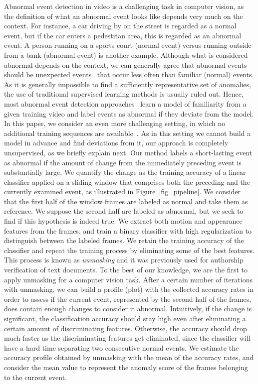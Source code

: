 \documentclass[10pt,twocolumn,letterpaper]{article}
\begin{document}
Abnormal event detection in video is a challenging task in computer vision, as the definition of what an abnormal event looks like depends very much on the context. For instance, a car driving by on the street is regarded as a normal event, but if the car enters a pedestrian area, this is regarded as an abnormal event. A person running on a sports court (normal event) versus running outside from a bank (abnormal event) is another example. Although what is considered abnormal depends on the context, we can generally agree that abnormal events should be unexpected events~\cite{Itti-CVPR-2005} that occur less often than familiar (normal) events. As it is generally impossible to find a sufficiently representative set of anomalies, the use of traditional supervised learning methods is usually ruled out. Hence, most abnormal event detection approaches~\cite{Antic-ICCV-2011,Cheng-CVPR-2015,Kim-CVPR-2009,Li-PAMI-2014,Lu-ICCV-2013,Mahadevan-CVPR-2010,Mehran-CVPR-2009,Xu-BMVC-2015,Zhao-CVPR-2011} learn a model of familiarity from a given training video and label events as abnormal if they deviate from the model. In this paper, we consider an even more challenging setting, in which no additional training sequences are available~\cite{Giorno-ECCV-2016}. As in this setting we cannot build a model in advance and find deviations from it, our approach is completely unsupervised, as we briefly explain next. Our method labels a short-lasting event as abnormal if the amount of change from the immediately preceding event is substantially large. We quantify the change as the training accuracy of a linear classifier applied on a sliding window that comprises both the preceding and the currently examined event, as illustrated in Figure~\ref{fig_pipeline}. We consider that the first half of the window frames are labeled as normal and take them as reference. We suppose the second half are labeled as abnormal, but we seek to find if this hypothesis is indeed true. We extract both motion and appearance features from the frames, and train a binary classifier with high regularization to distinguish between the labeled frames. We retain the training accuracy of the classifier and repeat the training process by eliminating some of the best features. This process is known as \emph{unmasking} \cite{Koppel-JMLR-2007} and it was previously used for authorship verification of text documents. To the best of our knowledge, we are the first to apply unmasking for a computer vision task. After a certain number of iterations with unmasking, we can build a profile (plot) with the collected accuracy rates in order to assess if the current event, represented by the second half of the frames, does contain enough changes to consider it abnormal. Intuitively, if the change is significant, the classification accuracy should stay high even after eliminating a certain amount of discriminating features. Otherwise, the accuracy should drop much faster as the discriminating features get eliminated, since the classifier will have a hard time separating two consecutive normal events. We estimate the accuracy profile obtained by unmasking with the mean of the accuracy rates, and consider the mean value to represent the anomaly score of the frames belonging to the current event.
\end{document}
